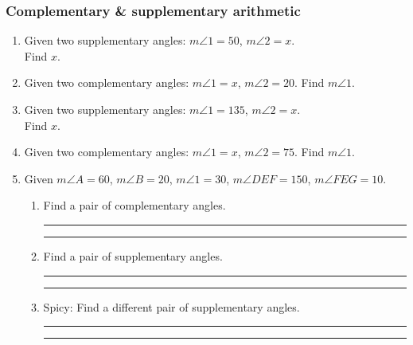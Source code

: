 \documentclass[12pt, twoside]{article}
\begin{document}
\subsubsection*{Complementary \& supplementary arithmetic}
  \begin{enumerate}
    \item Given two supplementary angles: $m \angle 1 = 50$, $m \angle 2 = x$.\\ Find $x$. %
    \item Given two complementary angles: $m \angle 1 = x$, $m \angle 2 = 20$. Find $m \angle 1$. %

    \item Given two supplementary angles: $m \angle 1 = 135$, $m \angle 2 = x$.\\ Find $x$. %
    \item Given two complementary angles: $m \angle 1 = x$, $m \angle 2 = 75$. Find $m \angle 1$. %

    \item Given $m \angle A=60$, $m \angle B=20$, $m \angle 1=30$, $m \angle DEF=150$, $m \angle FEG=10$. \bigskip
    \begin{enumerate}
      \item Find a pair of complementary angles. \rule{3cm}{0.15mm} \hspace{1cm} \rule{3cm}{0.15mm} \bigskip
      \item Find a pair of supplementary angles. \rule{3cm}{0.15mm} \hspace{1cm} \rule{3cm}{0.15mm} \bigskip
      \item Spicy: Find a different pair of supplementary angles. \rule{2cm}{0.15mm} \hspace{.5cm} \rule{2cm}{0.15mm}
      \end{enumerate}

    \end{enumerate}
\end{document}
